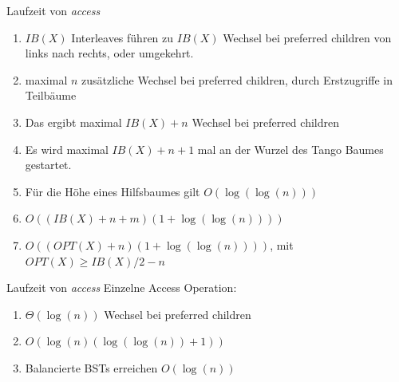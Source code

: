 \documentclass[11pt]{beamer}
\begin{document}
\begin{frame} {Laufzeit von \textit{access}}
	\begin{enumerate}
         \item $\mathit{IB}\left(X\right)$ Interleaves führen zu $\mathit{IB}\left(X\right)$  Wechsel bei preferred children von links nach rechts, oder umgekehrt.
         \item maximal $n$ zusätzliche Wechsel bei preferred children, durch Erstzugriffe in Teilbäume 
         \pause
         \item Das ergibt maximal  $\mathit{IB}\left(X\right) + n$ Wechsel bei preferred children 
         \pause
         \item Es wird maximal $\mathit{IB}\left(X\right) + n + 1$ mal an der Wurzel des Tango Baumes gestartet.
         \item Für die Höhe eines Hilfsbaumes gilt $O\left(\log\left(\log\left(n\right)\right)\right)$
         \pause
         \item $O\left(\left(\mathit{IB}\left(X\right) + n +m \right) \left( 1 + \log \left(\log\left(n\right)\right)\right) \right)$
         \pause
         \item 	$O\left(\left(\mathit{OPT}\left(X\right) + n  \right) \left( 1 + \log \left(\log\left(n\right)\right)\right) \right)$, mit $\mathit{OPT}\left(X\right) \geq \mathit{IB}\left(X\right) /2 -n $
    \end{enumerate} 
\end{frame}

\begin{frame} {Laufzeit von \textit{access}}
	Einzelne Access Operation:
	\begin{enumerate}
		\item $\Theta\left(\log\left(n\right)\right)$ Wechsel bei preferred children
		\pause
		\item $  O \left(\log\left(n\right)   \left( \log \left(\log\left(n\right)\right) + 1\right)\right)$
		\pause
		\item Balancierte BSTs erreichen $O \left( \log\left(n\right)\right)$
	\end{enumerate} 
\end{frame}
\end{document}
